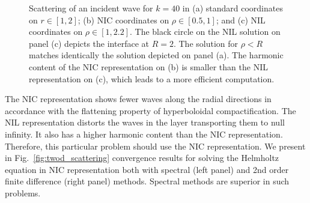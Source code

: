 \documentclass[final,onefignum,onetabnum]{siamart190516}
\begin{document}
\begin{figure}[ht]
{\begin{minipage}[c][1\width]{
	   0.32\textwidth}
	\end{minipage}}
\caption{Scattering of an incident wave for $k=40$ in (a) standard coordinates on $r\in[1,2]$; (b) NIC coordinates on $\rho\in[0.5,1]$; and (c) NIL coordinates on $\rho\in[1,2.2]$. The black circle on the NIL solution on panel (c) depicts the interface at $R=2$. The solution for $\rho<R$ matches identically the solution depicted on panel (a). The harmonic content of the NIC representation on (b) is smaller than the NIL representation on (c), which leads to a more efficient computation.}
\label{fig:soft_sound}
\end{figure}



The NIC representation shows fewer waves along the radial directions in accordance with the flattening property of hyperboloidal compactification. The NIL representation distorts the waves in the layer transporting them to null infinity. It also has a higher harmonic content than the NIC representation. Therefore, this particular problem should use the NIC representation. We present in Fig.~\ref{fig:twod_scattering} convergence results for solving the Helmholtz equation in NIC representation both with spectral (left panel) and 2nd order finite difference (right panel) methods. Spectral methods are superior in such problems.
\end{document}

